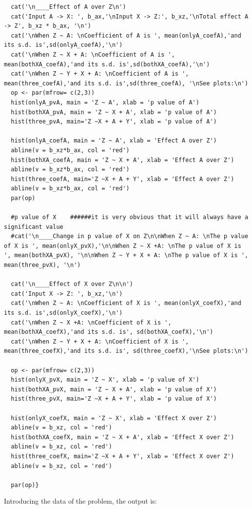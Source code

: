\documentclass{article}
\begin{document}
\begin{lstlisting}
  cat('\n____Effect of A over Z\n')
  cat('Input A -> X: ', b_ax,'\nInput X -> Z:', b_xz,'\nTotal effect A -> Z', b_xz * b_ax, '\n')
  cat('\nWhen Z ~ A: \nCoefficient of A is ', mean(onlyA_coefA),'and its s.d. is',sd(onlyA_coefA),'\n')
  cat('\nWhen Z ~ X + A: \nCoefficient of A is ', mean(bothXA_coefA),'and its s.d. is',sd(bothXA_coefA),'\n')
  cat('\nWhen Z ~ Y + X + A: \nCoefficient of A is ', mean(three_coefA),'and its s.d. is',sd(three_coefA), '\nSee plots:\n')
  op <- par(mfrow= c(2,3))
  hist(onlyA_pvA, main = 'Z ~ A', xlab = 'p value of A')
  hist(bothXA_pvA, main = 'Z ~ X + A', xlab = 'p value of A')
  hist(three_pvA, main='Z ~X + A + Y', xlab = 'p value of A')
  
  hist(onlyA_coefA, main = 'Z ~ A', xlab = 'Effect A over Z')
  abline(v = b_xz*b_ax, col = 'red')
  hist(bothXA_coefA, main = 'Z ~ X + A', xlab = 'Effect A over Z')
  abline(v = b_xz*b_ax, col = 'red')
  hist(three_coefA, main='Z ~X + A + Y', xlab = 'Effect A over Z')
  abline(v = b_xz*b_ax, col = 'red')
  par(op)
  
  #p value of X    ######it is very obvious that it will always have a significant value
  #cat('\n____Change in p value of X on Z\n\nWhen Z ~ A: \nThe p value of X is ', mean(onlyX_pvX),'\n\nWhen Z ~ X +A: \nThe p value of X is ', mean(bothXA_pvX), '\n\nWhen Z ~ Y + X + A: \nThe p value of X is ', mean(three_pvX), '\n')
  
  cat('\n____Effect of X over Z\n\n')
  cat('Input X -> Z: ', b_xz,'\n')
  cat('\nWhen Z ~ A: \nCoefficient of X is ', mean(onlyX_coefX),'and its s.d. is',sd(onlyX_coefX),'\n')
  cat('\nWhen Z ~ X +A: \nCoefficient of X is ', mean(bothXA_coefX),'and its s.d. is', sd(bothXA_coefX),'\n')
  cat('\nWhen Z ~ Y + X + A: \nCoefficient of X is ', mean(three_coefX),'and its s.d. is', sd(three_coefX),'\nSee plots:\n')
  
  op <- par(mfrow= c(2,3))
  hist(onlyX_pvX, main = 'Z ~ X', xlab = 'p value of X')
  hist(bothXA_pvX, main = 'Z ~ X + A', xlab = 'p value of X')
  hist(three_pvX, main='Z ~X + A + Y', xlab = 'p value of X')
  
  hist(onlyX_coefX, main = 'Z ~ X', xlab = 'Effect X over Z')
  abline(v = b_xz, col = 'red')
  hist(bothXA_coefX, main = 'Z ~ X + A', xlab = 'Effect X over Z')
  abline(v = b_xz, col = 'red')
  hist(three_coefX, main='Z ~X + A + Y', xlab = 'Effect X over Z')
  abline(v = b_xz, col = 'red')
  
  par(op)}
\end{lstlisting}

Introducing the data of the problem, the output is:
\end{document}
